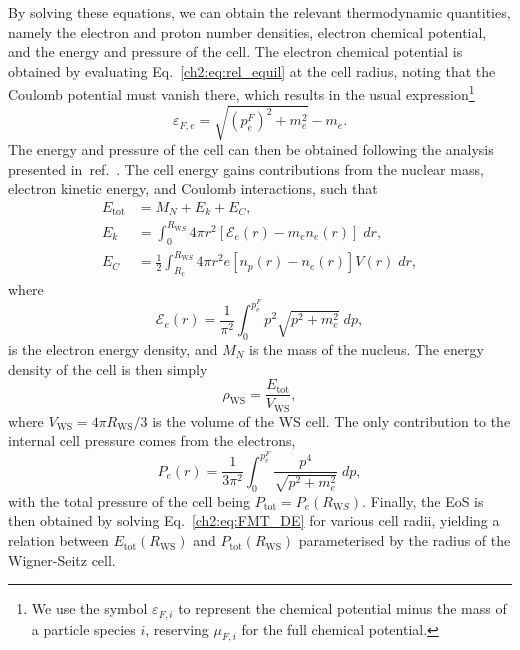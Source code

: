 By solving these equations, we can obtain the relevant thermodynamic quantities, namely the electron and proton number densities, electron chemical potential, and the energy and pressure of the cell. The electron chemical potential is obtained by evaluating Eq.~\ref{ch2:eq:rel_equil} at the cell radius, noting that the Coulomb potential must vanish there, which results in the usual expression\footnote{We use the symbol $\varepsilon_{F,i}$ to represent the chemical potential minus the mass of a particle species $i$, reserving $\mu_{F,i}$ for the full chemical potential.}
\begin{equation}
    \varepsilon_{F,e} = \sqrt{(p_e^F)^2+m_e^2}-m_e.\label{ch2:eq:mufe}
\end{equation}
The energy and pressure of the cell can then be obtained following the analysis presented in~ref.~\cite{Rotondo:2011zz_RelativisticFeynmanMetropolisTellertheory}. The cell energy gains contributions from the nuclear mass, electron kinetic energy, and Coulomb interactions, such that
\begin{align}
    E_\mathrm{tot} & = M_N + E_k + E_C,\label{ch2:eq:total_E_cell}\\
    E_k & = \int_0^{R_{\mathrm WS}}4\pi r^2 [\mathcal{E}_e(r) - m_e n_e(r)]\;dr,\label{ch2:eq:kinetic_E_cell}\\
    E_C & = \frac{1}{2}\int_{R_c}^{R_{\mathrm WS}}4\pi r^2 e[n_p(r) - n_e(r)]V(r)\;dr,\label{ch2:eq:Coulomb_E_cell}
\end{align}
where
\begin{equation}
    \mathcal{E}_e(r) = \frac{1}{\pi^2}\int_0^{p_e^F}p^2\sqrt{p^2 + m_e^2}\;dp,
\end{equation}
is the electron energy density, and  $M_N$ is the mass of the nucleus. The energy density of the cell is then simply
\begin{equation}
    \rho_\mathrm{WS} = \frac{E_\mathrm{tot}}{V_\mathrm{WS}},
\end{equation} 
where $V_\mathrm{WS} = 4\pi R_\mathrm{WS}/3$ is the volume of the WS cell. 
The only contribution to the internal cell pressure comes from the electrons,
\begin{equation}
    P_e(r) = \frac{1}{3\pi^2}\int_0^{p_e^F}\frac{p^4}{\sqrt{p^2+m_e^2}}\;dp,
\end{equation}
with the total pressure of the cell being $P_\mathrm{tot} = P_e(R_{\mathrm WS})$.
Finally, the EoS is then obtained by solving Eq.~\ref{ch2:eq:FMT_DE} for various cell radii, yielding a relation between $E_\mathrm{tot}(R_\mathrm{WS})$ and $P_\mathrm{tot}(R_\mathrm{WS})$ parameterised by the radius of the Wigner-Seitz cell. 


